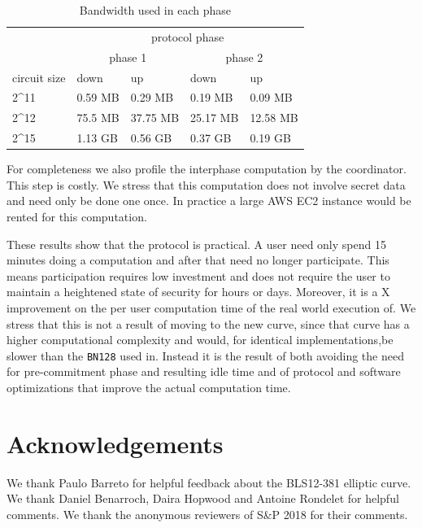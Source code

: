 \documentclass{article}
\begin{document}
\begin{table}[h]
\centering
\caption{Bandwidth used in each phase}
\label{tab:bandwidth}
\begin{adjustbox}{width=\linewidth}
\centering
\begin{tabular}{l|l|l|l|l|}
\cline{2-5}
                                           & \multicolumn{4}{c|}{protocol phase}                         \\ \cline{2-5} 
                                           & \multicolumn{2}{c|}{phase 1} & \multicolumn{2}{c|}{phase 2} \\ \hline
\multicolumn{1}{|c|}{circuit size}         & down          & up           & down          & up           \\ \hline
\multicolumn{1}{|l|}{2\textasciicircum 11} & 0.59 MB        & 0.29  MB      & 0.19 MB        & 0.09 MB       \\ \hline
\multicolumn{1}{|l|}{2\textasciicircum 12} & 75.5 MB        & 37.75 MB       & 25.17 MB        & 12.58 MB        \\ \hline
\multicolumn{1}{|l|}{2\textasciicircum 15} & 1.13 GB        & 0.56 GB       & 0.37 GB        & 0.19 GB       \\ \hline
\end{tabular}
\end{adjustbox}
\end{table}


For completeness we also profile the interphase computation by the coordinator. This step is costly. We stress that this computation does not involve secret data and need only be done one once. In practice a large AWS EC2 instance would be rented for this computation.


These results show that the protocol is  practical. A user need only spend 15 minutes doing a computation and after that need no longer participate. This means participation requires low investment and does not require the user to maintain a heightened state of security for hours or days.  Moreover, it is a  X improvement on the per user computation time of the real world execution of\cite{BGG17}. We stress that this is not a result of moving to the new curve, since that curve has a higher computational complexity and would, for identical implementations,be slower than the \texttt{BN128} used in\cite{BGG17}. Instead it is the result of both avoiding the need for pre-commitment phase and resulting idle time and of protocol and software optimizations that improve the actual computation time.




 \section*{Acknowledgements}
 We thank Paulo Barreto for helpful feedback about the BLS12-381 elliptic curve. We thank Daniel Benarroch, Daira Hopwood and Antoine Rondelet for helpful comments. We thank the anonymous reviewers of S\&P 2018 for their comments.




\end{document}
